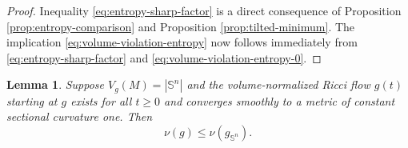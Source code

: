 \documentclass[11pt, reqno]{amsart}
\numberwithin{equation}{section}
\newtheorem{lemma}[theorem]{Lemma}
\theoremstyle{remark}
\newcommand{\Sph}{\mathbb S}
\begin{document}
\begin{proof}
Inequality \eqref{eq:entropy-sharp-factor} is a direct consequence of Proposition \ref{prop:entropy-comparison} and
Proposition \ref{prop:tilted-minimum}. The implication
\eqref{eq:volume-violation-entropy} now follows immediately from \eqref{eq:entropy-sharp-factor} and \eqref{eq:volume-violation-entropy-0}.
\end{proof}

\begin{lemma}\label{lem:round-flow-upper}
Suppose $V_g(M)=|\Sph^n|$ and the volume-normalized Ricci flow $g(t)$ starting at
$g$ exists for all $t\geq0$ and converges smoothly  to a metric of constant sectional curvature one. Then
\begin{equation}\label{eq:nu-upper}
\nu(g)\leq\nu(g_{\Sph^n}).
\end{equation}
\end{lemma}
\end{document}
